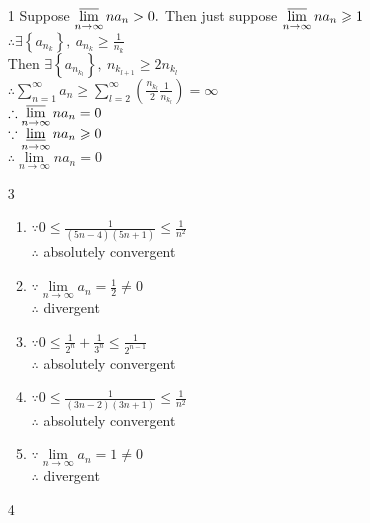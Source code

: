 \begin{enumerate}[1]
	\item[1]
	Suppose \(\varlimsup \limits_{n \rightarrow \infty} na_{n}>0 .\) Then just suppose \( \varlimsup \limits_{n \rightarrow \infty} na_{n} \geqslant 1\)\\
	\(\therefore \exists\left\{a_{n_{k}}\right\},\ a_{n_{k}} \geqslant \frac{1}{n_{k}}\)\\
	Then \(\exists\left\{a_{n_{k_{l}}}\right\},\ n_{k_{l+1}} \geqslant 2 n_{k_{l}}\)\\
	\(\therefore \sum\limits_{n=1}^{\infty} a_{n} \geqslant \sum\limits_{l=2}^{\infty}\left(\frac{n_{k_{l}}}{2} \frac{1}{n_{k_{l}}}\right)=\infty\)\\
	\(\therefore \varlimsup \limits_{n \rightarrow \infty} n a_{n}=0\)\\
	\(\because \varliminf \limits_{n \rightarrow \infty}  n a_{n} \geqslant 0\)\\
	\(\therefore \lim \limits_{n \rightarrow \infty}  n a_{n}=0\)
	

	\item[3]

\begin{enumerate}[(1)]
	\item 	
	\(\because 0 \leqslant \frac{1}{(5 n-4)(5 n+1)} \leqslant \frac{1}{n^{2}}\)\\
	\(\therefore\) absolutely convergent

	\item 	
	\(\because \lim \limits_{n \rightarrow \infty} a_{n}=\frac{1}{2} \neq 0\)\\
	\(\therefore\) divergent

	\item 	
	\(\because 0 \leqslant \frac{1}{2^{n}}+\frac{1}{3^{n}} \leqslant \frac{1}{2^{n-1}}\)\\
	\(\therefore\) absolutely convergent

	\item 	
	\(\because 0 \leqslant \frac{1}{(3 n-2)(3 n+1)} \leqslant \frac{1}{n^{2}}\)\\
	\(\therefore\) absolutely convergent

	\item 	
	\(\because \lim \limits_{n \rightarrow \infty} a_{n}=1 \neq 0\)\\
	\(\therefore\) divergent


\end{enumerate}

	\item[4]	
	

\end{enumerate}
